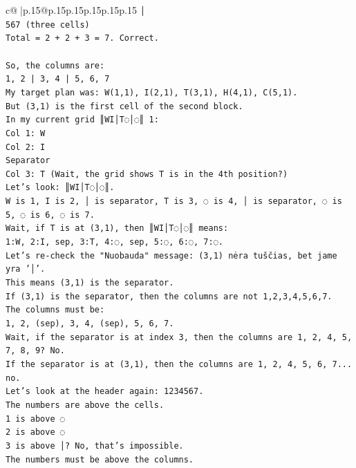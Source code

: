 \documentclass{article}
\begin{document}
{\begin{supertabular}{c@{$\;$}|p{.15\linewidth}@{}p{.15\linewidth}p{.15\linewidth}p{.15\linewidth}p{.15\linewidth}p{.15\linewidth}}
{{{\texttt{│} \\
\texttt{567 (three cells)} \\
\texttt{Total = 2 + 2 + 3 = 7. Correct.} \\
\\ 
\texttt{So, the columns are:} \\
\texttt{1, 2 | 3, 4 | 5, 6, 7} \\
\texttt{My target plan was: W(1,1), I(2,1), T(3,1), H(4,1), C(5,1).} \\
\texttt{But (3,1) is the first cell of the second block.} \\
\texttt{In my current grid ║WI│T◌│◌║ 1:} \\
\texttt{Col 1: W} \\
\texttt{Col 2: I} \\
\texttt{Separator} \\
\texttt{Col 3: T (Wait, the grid shows T is in the 4th position?)} \\
\texttt{Let's look: ║WI│T◌│◌║.} \\
\texttt{W is 1, I is 2, │ is separator, T is 3, ◌ is 4, │ is separator, ◌ is 5, ◌ is 6, ◌ is 7.} \\
\texttt{Wait, if T is at (3,1), then ║WI│T◌│◌║ means:} \\
\texttt{1:W, 2:I, sep, 3:T, 4:◌, sep, 5:◌, 6:◌, 7:◌.} \\
\texttt{Let's re{-}check the "Nuobauda" message: (3,1) nėra tuščias, bet jame yra '│'.} \\
\texttt{This means (3,1) is the separator.} \\
\texttt{If (3,1) is the separator, then the columns are not 1,2,3,4,5,6,7.} \\
\texttt{The columns must be:} \\
\texttt{1, 2, (sep), 3, 4, (sep), 5, 6, 7.} \\
\texttt{Wait, if the separator is at index 3, then the columns are 1, 2, 4, 5, 7, 8, 9? No.} \\
\texttt{If the separator is at (3,1), then the columns are 1, 2, 4, 5, 6, 7... no.} \\
\texttt{Let's look at the header again: 1234567.} \\
\texttt{The numbers are above the cells.} \\
\texttt{1 is above ◌} \\
\texttt{2 is above ◌} \\
\texttt{3 is above │? No, that's impossible.} \\
\texttt{The numbers must be above the columns.} \\
}}}
\end{supertabular}}
\end{document}
